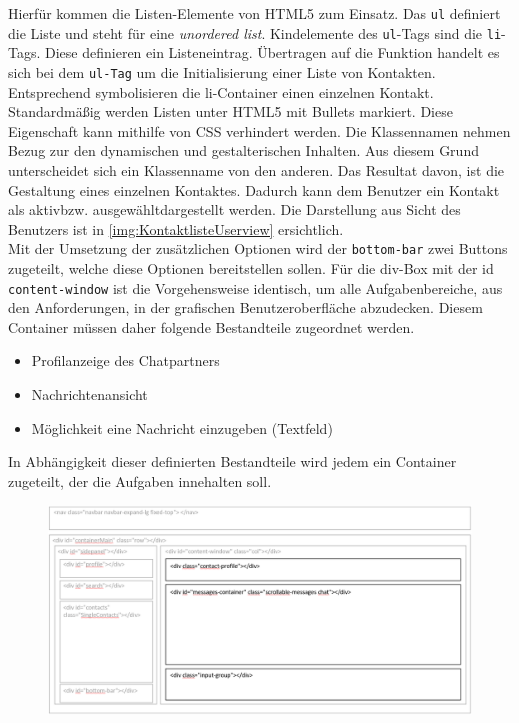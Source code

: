 \documentclass[a4paper,titlepage,halfparskip,12pt]{scrreprt}
\begin{document}
\begin{onehalfspacing}
\begin{figure}[h]
\end{figure}
Hierfür kommen die Listen-Elemente von HTML5 zum Einsatz. Das \texttt{ul} definiert die Liste und steht für eine \textit{unordered list}. Kindelemente des \texttt{ul}-Tags sind die \texttt{li}-Tags. Diese definieren ein Listeneintrag.
Übertragen auf die Funktion handelt es sich bei dem \texttt{ul-Tag} um die Initialisierung einer Liste von Kontakten. Entsprechend symbolisieren die li-Container einen einzelnen Kontakt. Standardmäßig werden Listen unter HTML5 mit Bullets markiert. Diese Eigenschaft kann mithilfe von CSS verhindert werden. Die Klassennamen nehmen Bezug zur den dynamischen und gestalterischen Inhalten. Aus diesem Grund unterscheidet sich ein Klassenname von den anderen. Das Resultat davon, ist die Gestaltung eines einzelnen Kontaktes. Dadurch kann dem Benutzer ein Kontakt als \glqq aktiv\grqq bzw. \glqq ausgewählt\grqq dargestellt werden. Die Darstellung aus Sicht des Benutzers ist in \autoref{img:KontaktlisteUserview} ersichtlich. \cite{w3schoolsUlTag}\\
Mit der Umsetzung der zusätzlichen Optionen wird der \texttt{bottom-bar} zwei Buttons zugeteilt, welche diese Optionen bereitstellen sollen. Für die div-Box mit der id \texttt{content-window} ist die Vorgehensweise identisch, um alle Aufgabenbereiche, aus den Anforderungen, in der grafischen Benutzeroberfläche abzudecken. Diesem Container müssen daher folgende Bestandteile zugeordnet werden.
\begin{itemize}
	\item Profilanzeige des Chatpartners
	\item Nachrichtenansicht
	\item Möglichkeit eine Nachricht einzugeben (Textfeld)
\end{itemize}
In Abhängigkeit dieser definierten Bestandteile wird jedem ein Container zugeteilt, der die Aufgaben innehalten soll.
\begin{figure}[h]
	\centering
	\includegraphics[scale=0.63]{images/BasisStruktur1GochatContentWindow}

\end{figure}
\end{onehalfspacing}
\end{document}
